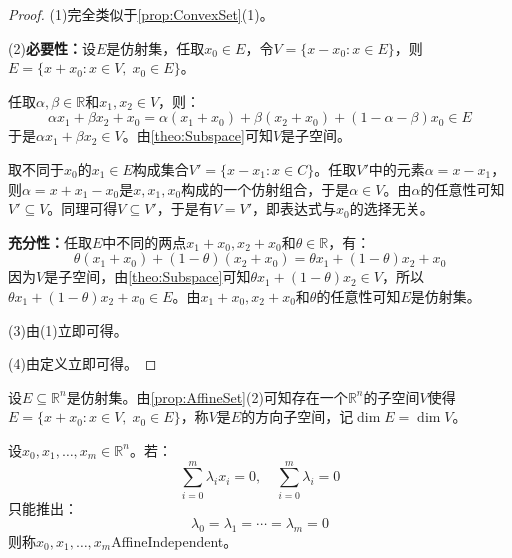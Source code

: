 \begin{proof}
	(1)完全类似于\cref{prop:ConvexSet}(1)。\par
	(2)\textbf{必要性：}设$E$是仿射集，任取$x_0\in E$，令$V=\{x-x_0:x\in E\}$，则$E=\{x+x_0:x\in V,\;x_0\in E\}$。\par
	任取$\alpha,\beta\in\mathbb{R}$和$x_1,x_2\in V$，则：
	\begin{equation*}
		\alpha x_1+\beta x_2+x_0=\alpha(x_1+x_0)+\beta(x_2+x_0)+(1-\alpha-\beta)x_0\in E
	\end{equation*}
	于是$\alpha x_1+\beta x_2\in V$。由\cref{theo:Subspace}可知$V$是子空间。\par
	取不同于$x_0$的$x_1\in E$构成集合$V'=\{x-x_1:x\in C\}$。任取$V'$中的元素$\alpha=x-x_1$，则$\alpha=x+x_1-x_0$是$x,x_1,x_0$构成的一个仿射组合，于是$\alpha\in V$。由$\alpha$的任意性可知$V'\subseteq V$。同理可得$V\subseteq V'$，于是有$V=V'$，即表达式与$x_0$的选择无关。\par
	\textbf{充分性：}任取$E$中不同的两点$x_1+x_0,x_2+x_0$和$\theta\in\mathbb{R}$，有：
	\begin{equation*}
		\theta(x_1+x_0)+(1-\theta)(x_2+x_0)=\theta x_1+(1-\theta)x_2+x_0
	\end{equation*}
	因为$V$是子空间，由\cref{theo:Subspace}可知$\theta x_1+(1-\theta)x_2\in V$，所以$\theta x_1+(1-\theta)x_2+x_0\in E$。由$x_1+x_0,x_2+x_0$和$\theta$的任意性可知$E$是仿射集。\par
	(3)由(1)立即可得。\par
	(4)由定义立即可得。
\end{proof}
\begin{definition}
	设$E\subseteq\mathbb{R}^{n}$是仿射集。由\cref{prop:AffineSet}(2)可知存在一个$\mathbb{R}^{n}$的子空间$V$使得$E=\{x+x_0:x\in V,\;x_0\in E\}$，称$V$是$E$的方向子空间，记$\dim E=\dim V$。
\end{definition}
\begin{definition}
	设$x_0,x_1,\dots,x_m\in\mathbb{R}^n$。若：
	\begin{equation*}
		\sum_{i=0}^{m}\lambda_ix_i=0,\quad\sum_{i=0}^{m}\lambda_i=0
	\end{equation*}
	只能推出：
	\begin{equation*}
		\lambda_0=\lambda_1=\cdots=\lambda_m=0
	\end{equation*}
	则称$x_0,x_1,\dots,x_m$\gls{AffineIndependent}。
\end{definition}
